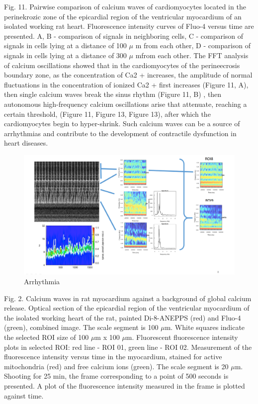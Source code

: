 \documentclass[a4paper,12pt]{article}
\begin{document}
Fig. 11. Pairwise comparison of calcium waves of cardiomyocytes located in the perinekrozic zone of the epicardial region of the ventricular myocardium of an isolated working rat heart. Fluorescence intensity curves of Fluo-4 versus time are presented. A, B - comparison of signals in neighboring cells, C - comparison of signals in cells lying at a distance of 100 $\mu$ m from each other, D - comparison of signals in cells lying at a distance of 300 $\mu$  mfrom each other.
The FFT analysis of calcium oscillations showed that in the cardiomyocytes of the perineecrosis boundary zone, as the concentration of Ca2 + increases, the amplitude of normal fluctuations in the concentration of ionized Ca2 + first increases (Figure 11, A), then single calcium waves break the sinus rhythm (Figure 11, B) , then autonomous high-frequency calcium oscillations arise that attenuate, reaching a certain threshold, (Figure 11, Figure 13, Figure 13), after which the cardiomyocytes begin to hyper-shrink. Such calcium waves can be a source of arrhythmias and contribute to the development of contractile dysfunction in heart diseases.

\begin{figure}
    \includegraphics[width=\linewidth]{fig6.png}
    \caption{Arrhythmia}
    \label{fig:fig6}
\end{figure}

Fig. 2.  Calcium waves in rat myocardium against a background of global calcium release. Optical section of the epicardial region of the ventricular myocardium of the isolated working heart of the rat, painted Di-8-ANEPPS (red) and Fluo-4 (green), combined image. The scale segment is 100 $\mu$m. White squares indicate the selected ROI size of 100 $\mu$m x 100 $\mu$m. Fluorescent fluorescence intensity plots in selected ROI: red line - ROI 01, green line - ROI 02. Measurement of the fluorescence intensity versus time in the myocardium, stained for active mitochondria (red) and free calcium ions (green). The scale segment is 20 $\mu$m. Shooting for 25 min, the frame corresponding to a point of 500 seconds is presented. A plot of the fluorescence intensity measured in the frame is plotted against time.
\end{document}
